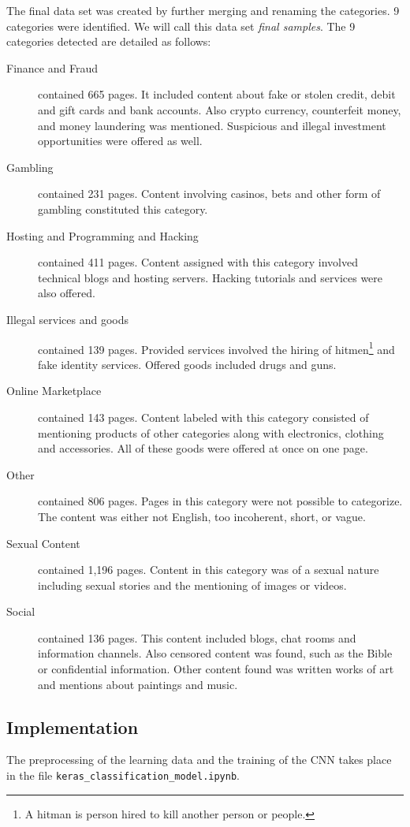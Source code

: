 The final data set was created by further merging and renaming the categories. 9 categories were identified. We will call this data set \textit{final samples}. The 9 categories detected are detailed as follows:
 \label{classificationCategories}
\begin {description}
	\item[Finance and Fraud] contained 665 pages. It included content about fake or stolen credit, debit and gift cards and bank accounts. Also crypto currency, counterfeit money, and money laundering was mentioned. Suspicious and illegal investment opportunities were offered as well.
	\item[Gambling] contained 231 pages. Content involving casinos, bets and other form of gambling constituted this category.
	\item[Hosting and Programming and Hacking] contained 411 pages. Content assigned with this category involved technical blogs and hosting servers. Hacking tutorials and services were also offered.
	\item[Illegal services and goods] contained 139 pages. Provided services involved the hiring of hitmen\footnote{A hitman is person hired to kill another person or people.} and fake identity services. Offered goods included drugs and guns.
	\item[Online Marketplace] contained 143 pages. Content labeled with this category consisted of mentioning products of other categories along with electronics, clothing and accessories. All of these goods were offered at once on one page.
	\item[Other] contained 806 pages. Pages in this category were not possible to categorize. The content was either not English, too incoherent, short, or vague. 
	\item[Sexual Content] contained 1,196 pages. Content in this category was of a sexual nature including sexual stories and the mentioning of images or videos.
	\item[Social] contained 136 pages. This content included blogs, chat rooms and information channels. Also censored content was found, such as the Bible or confidential information. Other content found was written works of art and mentions about paintings and music. 
\end{description}

\subsection{Implementation} \label{ClassificationImplementation}
The preprocessing of the learning data and the training of the CNN takes place in the file \texttt{keras\_classification\_model.ipynb}. 

